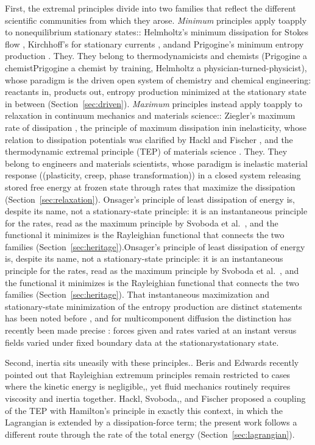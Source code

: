 \documentclass[12pt]{article}
\newif\ifhighlight \highlightfalse
\newif\ifhighlightfirst \highlightfirstfalse
\DeclareRobustCommand{\chg}[1]{\ifhighlight\ifhighlightfirst\textcolor{revised}{#1}\else#1\fi\else#1\fi}
\DeclareRobustCommand{\chgb}[1]{\ifhighlight\textcolor{revisedb}{#1}\else#1\fi}
\begin{document}
First, the extremal principles divide into two families that reflect the different scientific communities from which they arose. \textit{Minimum} principles \chg{apply to} nonequilibrium stationary states\chg{:} Helmholtz's minimum dissipation for Stokes flow \cite{helmholtz1868}, Kirchhoff's for stationary currents \cite{kirchhoff1848}, \chg{and} Prigogine's minimum entropy production \cite{kondepudi2014modern}\chg{. They} belong to thermodynamicists and chemists (\chg{Prigogine a chemist} by training, Helmholtz a physician-turned-physicist), whose paradigm is the driven open system of chemistry and chemical engineering: reactants in, products out, entropy production minimized at the stationary state in between (Section~\ref{sec:driven}). \textit{Maximum} principles instead \chg{apply to} relaxation in continuum mechanics and materials science\chg{:} Ziegler's maximum rate of dissipation \cite{ziegler1963}, the principle of maximum dissipation \chg{in} inelasticity, whose relation to dissipation potentials was clarified by Hackl and Fischer \cite{hackl2008}, and the thermodynamic extremal principle (TEP) of materials science \cite{svoboda2005application, fischer2014review}\chg{. They} belong to engineers and materials scientists, whose paradigm is inelastic material response \chg{(}plasticity, creep, phase transformation\chg{)} in a closed system releasing stored free energy at frozen state through rates that maximize the dissipation (Section~\ref{sec:relaxation}). \chg{Onsager's principle of least dissipation of energy \cite{onsager1931reciprocal} is, despite its name, not a stationary-state principle: it is an instantaneous principle for the rates, read as the maximum principle by Svoboda et al.\ \cite{svoboda2023note}, and \chgb{the functional it minimizes} is the Rayleighian functional that connects the two families (Section~\ref{sec:heritage}).} That instantaneous maximization and stationary-state minimization of the entropy production are distinct statements has been noted before \cite{struchtrup1998, polettini2013}, and for multicomponent diffusion the distinction has recently been made precise \cite{svoboda2023note}: forces given and rates varied at an \chgb{instant versus} fields varied under fixed boundary data at the \chg{stationary} state.

Second, inertia sits uneasily with these principles\chg{.} Beris and Edwards \cite{beris2024} recently pointed out that Rayleighian extremum principles remain restricted to cases where the kinetic energy is negligible\chg{,} yet fluid mechanics routinely requires viscosity and inertia together. Hackl, Svoboda\chg{,} and Fischer \cite{hackl2024coupling} \chgb{proposed a} coupling of the TEP with Hamilton's principle in exactly this context\chgb{, in which the Lagrangian is extended by a dissipation-force term; the present work follows a different route through the rate of the total energy (Section~\ref{sec:lagrangian})}.
\end{document}
